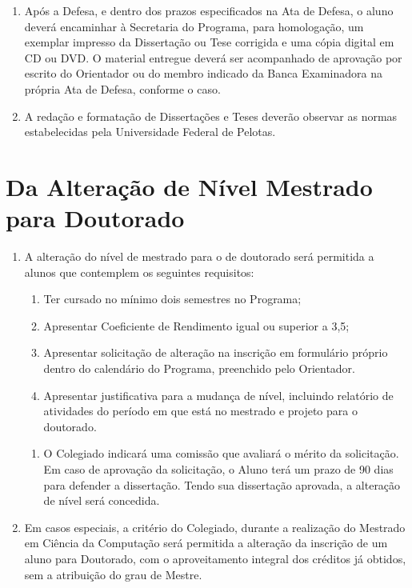 \documentclass{article}
\newcommand{\singleitem}{\item[Parágrafo Único.]}
\newcommand{\grupoMenor}{Colegiado\xspace}
\begin{document}
\begin{enumerate}
	\item Após a Defesa, e dentro dos prazos especificados na Ata de Defesa, o aluno deverá encaminhar à Secretaria do Programa, para homologação, um exemplar impresso da Dissertação ou Tese corrigida e uma cópia digital em CD ou DVD. O material entregue deverá ser acompanhado de aprovação por escrito do Orientador ou do membro indicado da Banca Examinadora na própria Ata de Defesa, conforme o caso.

	\item A redação e formatação de Dissertações e Teses deverão observar as normas estabelecidas pela Universidade Federal de Pelotas.

\end{enumerate}


\section{Da Alteração de Nível Mestrado para Doutorado}
\begin{enumerate}
	\item  A alteração do nível de mestrado para o de doutorado será permitida a alunos que contemplem os seguintes requisitos:
	\begin{enumerate}[label=\Roman*]
		\item Ter cursado no mínimo dois semestres no Programa;

		\item Apresentar Coeficiente de Rendimento igual ou superior a 3,5;

		\item Apresentar solicitação de alteração na inscrição em formulário próprio dentro do calendário do Programa, preenchido pelo Orientador.

		\item Apresentar justificativa para a mudança de nível, incluindo relatório de atividades do período em que está no mestrado e projeto para o doutorado.
	\end{enumerate}

	\begin{enumerate}
		\singleitem O \grupoMenor indicará uma comissão que avaliará o mérito da solicitação. Em caso de aprovação da solicitação, o Aluno terá um prazo de 90 dias para defender a dissertação. Tendo sua dissertação aprovada, a alteração de nível será concedida.
	\end{enumerate}

	\item Em casos especiais, a critério do \grupoMenor, durante a realização do Mestrado em Ciência da Computação será permitida a alteração da inscrição de um aluno para Doutorado, com o aproveitamento integral dos créditos já obtidos, sem a atribuição do grau de Mestre.
\end{enumerate}
\end{document}
